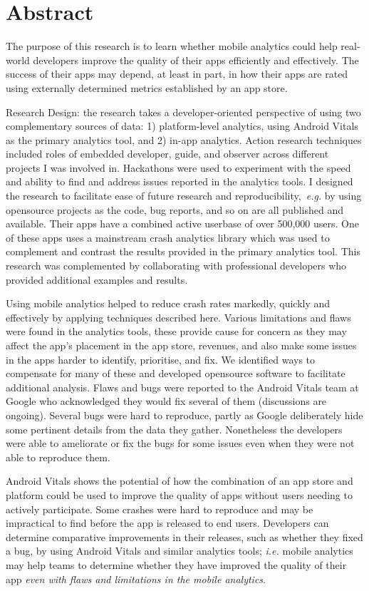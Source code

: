 \chapter*{Abstract}
\label{the-abstract}
\begin{SingleSpace}

The purpose of this research is to learn whether mobile analytics could help
real-world developers improve the quality of their apps efficiently and effectively. The success of their apps may depend, at least in part, in how their apps are rated using externally determined metrics established by an app store.

Research Design: the research takes a developer-oriented perspective of using two complementary sources of data: 1) platform-level analytics, using Android Vitals as the primary analytics tool, and 2) in-app analytics.
%
Action research techniques included roles of embedded developer, guide, and observer across different projects I was involved in. Hackathons were used to experiment with the speed and ability to find and address issues reported in the analytics tools. 
%
I designed the research to facilitate ease of future research and reproducibility,~\emph{e.g.} by using  opensource projects as the code, bug reports, and so on are all published and available. Their apps have a combined active userbase of over 500,000 users. One of these apps uses a mainstream crash analytics library which was used to complement and contrast the results provided in the primary analytics tool.
%
This research was complemented by collaborating with professional developers who provided additional examples and results.

Using mobile analytics helped to reduce crash rates markedly, quickly and effectively by applying techniques described here.
Various limitations and flaws were found in the analytics tools, these provide cause for concern as they may affect the app's placement in the app store, revenues, and also make some issues in the apps harder to identify, prioritise, and fix. We identified ways to compensate for many of these and developed opensource software to facilitate additional analysis. Flaws and bugs were reported to the Android Vitals team at Google who acknowledged they would fix several of them (discussions are ongoing).
%
Several bugs were hard to reproduce, partly as Google deliberately hide some pertinent details from the data they gather. Nonetheless the developers were able to ameliorate or fix the bugs for some issues even when they were not able to reproduce them. 

Android Vitals shows the potential of how the combination of an app store and platform could be used to improve the quality of apps without users needing to actively participate. Some crashes were hard to reproduce and may be impractical to find before the app is released to end users. Developers can determine comparative improvements in their releases, such as whether they fixed a bug, by using Android Vitals and similar analytics tools; \textit{i.e.} mobile analytics may help teams to determine whether they have improved the quality of their app \textit{even with flaws and limitations in the mobile analytics}.
\end{SingleSpace}
\newpage
